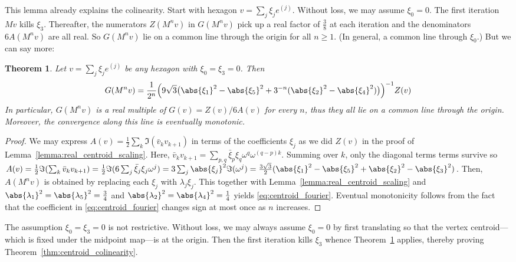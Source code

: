 \documentclass{amsart}
\DeclarePairedDelimiter\abs\lvert\rvert
\newtheorem{theorem}{Theorem}
\theoremstyle{definition}
\begin{document}
This lemma already explains the colinearity. Start with hexagon $v=\sum_j\xi_je^{(j)}$.  Without loss, we may assume $\xi_0=0$. The first iteration $Mv$ kills $\xi_3$. Thereafter, the numerators $Z(M^nv)$ in $G(M^nv)$ pick up a real factor of $\frac38$ at each iteration and the denominators $6A(M^nv)$ are all real. So $G(M^nv)$ lie on a common line through the origin for all $n\ge 1$. (In general, a common line through $\xi_0$.) But we can say more:

\begin{theorem}
    Let $v = \sum_j \xi_j e^{(j)}$ be any hexagon with $\xi_0=\xi_3=0$. Then
    \begin{equation}
        G(M^nv) = \frac{1}{2^n}\Big(9\sqrt 3\big(\abs{\xi_1}^2-\abs{\xi_5}^2+3^{-n}(\abs{\xi_2}^2-\abs{\xi_4}^2)\big)\Big)^{-1}Z(v)
        \label{eq:centroid_fourier}
    \end{equation}
    In particular, $G(M^nv)$ is a real multiple of $G(v) = Z(v)/6A(v)$ for every $n$, thus they all lie on a common line through the origin. Moreover, the convergence along this line is eventually monotonic. 
    \label{thm:centroid_fourier}
\end{theorem}
\begin{proof}
    We may express $A(v) = \frac12\sum_k\Im(\bar v_kv_{k+1})$ in terms of the coefficients $\xi_j$ as we did $Z(v)$ in the proof of Lemma~\ref{lemma:real_centroid_scaling}. Here, $\bar v_kv_{k+1} = \sum_{p,q}\bar\xi_p\xi_q\omega^q\omega^{(q-p)k}$. Summing over $k$, only the diagonal terms terms survive so $A(v) = \frac12\Im(\sum_k\bar v_kv_{k+1}) = \frac12\Im(6\sum_j \bar\xi_j\xi_j\omega^j) = 3\sum_j\abs{\xi_j}^2\Im(\omega^j) = \frac{3\sqrt 3}{2}(\abs{\xi_1}^2-\abs{\xi_5}^2+\abs{\xi_2}^2-\abs{\xi_3}^2)$. Then, $A(M^nv)$ is obtained by replacing each $\xi_j$ with $\lambda_j\xi_j$. This together with Lemma~\ref{lemma:real_centroid_scaling} and $\abs{\lambda_1}^2 = \abs{\lambda_5}^2 = \frac34$ and $\abs{\lambda_2}^2 = \abs{\lambda_4}^2 = \frac14$ yields \eqref{eq:centroid_fourier}. Eventual monotonicity follows from the fact that the coefficient in \eqref{eq:centroid_fourier} changes sign at most once as $n$ increases.
\end{proof}

The assumption $\xi_0=\xi_3=0$ is not restrictive. Without loss, we may always assume $\xi_0 = 0$ by first translating so that the vertex centroid---which is fixed under the midpoint map---is at the origin. Then the first iteration kills $\xi_3$ whence Theorem~\ref{thm:centroid_fourier} applies, thereby proving Theorem~\ref{thm:centroid_colinearity}.
\end{document}
